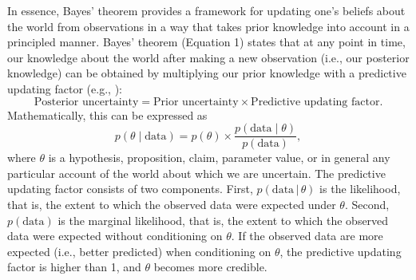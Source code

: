 \documentclass[man]{apa7}
\newcommand{\given}{\, | \,}
\begin{document}
In essence, Bayes' theorem provides a framework for updating one's beliefs about the world from observations in a way that takes prior knowledge into account in a principled manner. Bayes' theorem (Equation 1) states that at any point in time, our knowledge about the world after making a new observation (i.e., our posterior knowledge) can be obtained by multiplying our prior knowledge with a predictive updating factor (e.g., \cite{RouderMorey2019,WagenmakersEtAl2016CD} ):
\begin{equation*}
        \text{Posterior uncertainty} = \text{Prior uncertainty} \times \text{Predictive updating factor}.
\end{equation*}
Mathematically, this can be expressed as  
\begin{equation}
\label{eq:BayesRule}
        p(\theta \mid \text{data}) = p(\theta) \times \frac{p(\text{data} \mid \theta)}{p(\text{data})},
\end{equation}
where $\theta$ is a hypothesis, proposition, claim, parameter value, or in general any particular account of the world about which we are uncertain. The predictive updating factor consists of two components. First, $p(\text{data} \given \theta)$ is the likelihood, that is, the extent to which the observed data were expected under $\theta$. Second, $p(\text{data})$ is the marginal likelihood, that is, the extent to which the observed data were expected without conditioning on $\theta$. If the observed data are more expected (i.e., better predicted) when conditioning on $\theta$, the predictive updating factor is higher than 1, and $\theta$ becomes more credible. 
\end{document}
